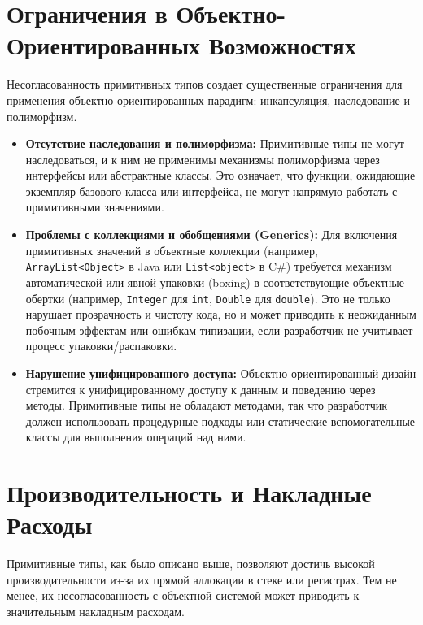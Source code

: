 \section{Ограничения в Объектно-Ориентированных Возможностях}
Несогласованность примитивных типов создает существенные ограничения для применения объектно-ориентированных парадигм: инкапсуляция, наследование и полиморфизм.

\begin{itemize}
    \item \textbf{Отсутствие наследования и полиморфизма:} Примитивные типы не могут наследоваться, и к ним не применимы механизмы полиморфизма через интерфейсы или абстрактные классы. Это означает, что функции, ожидающие экземпляр базового класса или интерфейса, не могут напрямую работать с примитивными значениями.

    \item \textbf{Проблемы с коллекциями и обобщениями (Generics):} Для включения примитивных значений в объектные коллекции (например, \texttt{ArrayList<Object>} в Java или \texttt{List<object>} в C\#) требуется механизм автоматической или явной упаковки (boxing) в соответствующие объектные обертки (например, \texttt{Integer} для \texttt{int}, \texttt{Double} для \texttt{double}). Это не только нарушает прозрачность и чистоту кода, но и может приводить к неожиданным побочным эффектам или ошибкам типизации, если разработчик не учитывает процесс упаковки/распаковки.

    \item \textbf{Нарушение унифицированного доступа:} Объектно-ориентированный дизайн стремится к унифицированному доступу к данным и поведению через методы. Примитивные типы не обладают методами, так что разработчик должен использовать процедурные подходы или статические вспомогательные классы для выполнения операций над ними.
\end{itemize}

\section{Производительность и Накладные Расходы}
\label{sec:performance}

Примитивные типы, как было описано выше, позволяют достичь высокой производительности из-за их прямой аллокации в стеке или регистрах. Тем не менее, их несогласованность с объектной системой может приводить к значительным накладным расходам.

